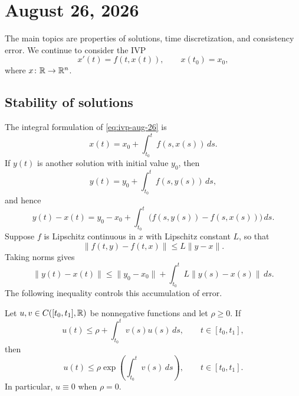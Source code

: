 \section{August 26, 2026}

The main topics are properties of solutions, time discretization, and
consistency error. We continue to consider the IVP
\begin{equation}\label{eq:ivp-aug-26}
  x'(t)=f(t,x(t)),
  \qquad
  x(t_0)=x_0,
\end{equation}
where $x\colon \mathbb{R}\to\mathbb{R}^n$.

\subsection{Stability of solutions}

The integral formulation of \eqref{eq:ivp-aug-26} is
\[
  x(t)=x_0+\int_{t_0}^t f(s,x(s))\,ds.
\]
If $y(t)$ is another solution with initial value $y_0$, then
\[
  y(t)=y_0+\int_{t_0}^t f(s,y(s))\,ds,
\]
and hence
\[
  y(t)-x(t)
  =y_0-x_0
   +\int_{t_0}^t\bigl(f(s,y(s))-f(s,x(s))\bigr)\,ds.
\]
Suppose $f$ is Lipschitz continuous in $x$ with Lipschitz constant $L$,
so that
\[
  \lVert f(t,y)-f(t,x)\rVert\leq L\lVert y-x\rVert.
\]
Taking norms gives
\begin{equation}\label{eq:solution-difference-aug-26}
  \lVert y(t)-x(t)\rVert
  \leq \lVert y_0-x_0\rVert
  +\int_{t_0}^t L\lVert y(s)-x(s)\rVert\,ds.
\end{equation}
The following inequality controls this accumulation of error.

\begin{lemma}\label{lem:gronwall}
  Let $u,v\in C([t_0,t_1],\mathbb{R})$ be nonnegative functions and let
  $\rho\geq 0$. If
  \begin{equation}\label{eq:gronwall-hypothesis}
    u(t)\leq \rho+\int_{t_0}^t v(s)u(s)\,ds,
    \qquad t\in[t_0,t_1],
  \end{equation}
  then
  \begin{equation}\label{eq:gronwall-conclusion}
    u(t)\leq \rho
    \exp\left(\int_{t_0}^t v(s)\,ds\right),
    \qquad t\in[t_0,t_1].
  \end{equation}
  In particular, $u\equiv 0$ when $\rho=0$.
\end{lemma}

